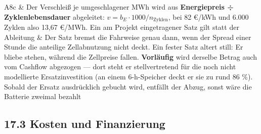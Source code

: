 \documentclass[
  a4paper,
  10pt]{article}
\begin{document}
\begin{longtable}[]
A8c & Der Verschleiß je umgeschlagener MWh wird aus \textbf{Energiepreis
÷ Zyklenlebensdauer} abgeleitet:
\(v = b_E \cdot 1000 / n_{\text{Zyklen}}\), bei 82 €/kWh und 6.000
Zyklen also 13,67 €/MWh. Ein am Projekt eingetragener Satz gilt statt
der Ableitung & Der Satz bremst die Fahrweise genau dann, wenn der
Spread einer Stunde die anteilige Zellabnutzung nicht deckt. Ein fester
Satz altert still: Er bliebe stehen, während die Zellpreise fallen.
\textbf{Vorläufig} wird derselbe Betrag auch vom Cashflow abgezogen ---
dort steht er stellvertretend für die noch nicht modellierte
Ersatzinvestition (an einem 6-h-Speicher deckt er sie zu rund 86 \%).
Sobald der Ersatz ausdrücklich gebucht wird, entfällt der Abzug, sonst
wäre die Batterie zweimal bezahlt \\
\end{longtable}

\hypertarget{kosten-und-finanzierung}{%
\subsection{17.3 Kosten und
Finanzierung}\label{kosten-und-finanzierung}}
\end{document}
